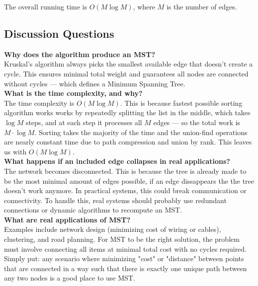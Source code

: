 \documentclass{article}
\begin{document}
  The overall running time is \( O(M \log M) \), where \( M \) is the number of edges.

  \subsection*{Discussion Questions}

  \textbf{Why does the algorithm produce an MST?} \\
  Kruskal’s algorithm always picks the smallest available edge that doesn’t create a cycle. This ensures minimal total weight and guarantees all nodes are connected without cycles — which defines a Minimum Spanning Tree.\\ 

  \textbf{What is the time complexity, and why?} \\
  The time complexity is \( O(M \log M) \). This is because fastest possible sorting algorithm works works by repeatedly splitting the list in the middle, which takes \( \log M \) steps, and at each step it processes all \( M \) edges — so the total work is \( M \cdot \log M \). Sorting takes the majority of the time and the union-find operations are nearly constant time due to path compression and union by rank. This leaves us with \( O(M \log M) \).\\ 

  \textbf{What happens if an included edge collapses in real applications?} \\
  The network becomes disconnected. This is because the tree is already made to be the most minimal amount of edges possible, if an edge dissappears the the tree doesn't work anymore. In practical systems, this could break communication or connectivity. To handle this, real systems should probably use redundant connections or dynamic algorithms to recompute an MST.\\ 

  \textbf{What are real applications of MST?} \\
  Examples include network design (minimizing cost of wiring or cables), clustering, and road planning. For MST to be the right solution, the problem must involve connecting all items at minimal total cost with no cycles required.\\ 
  Simply put: any scenario where minimizing "cost" or "distance" between points that are connected in a way such that there is exactly one unique path between any two nodes is a good place to use MST.
\end{document}
